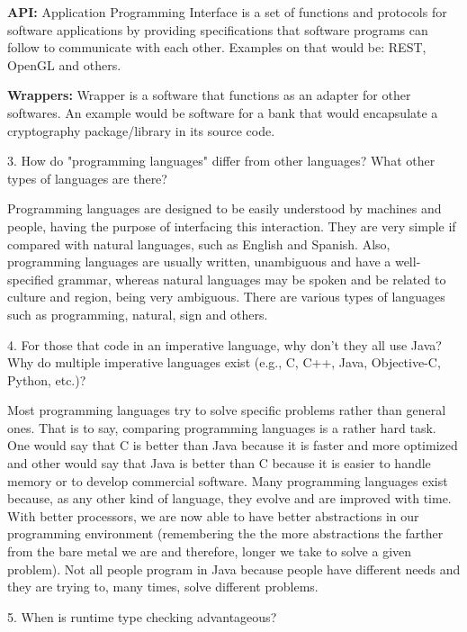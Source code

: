 \documentclass{article}
\begin{document}
\textbf{API:} Application Programming Interface is a set of functions and protocols for software applications by providing specifications that software programs can follow to communicate with each other. Examples on that would be: REST, OpenGL and others.

\textbf{Wrappers:} Wrapper is a software that functions as an adapter for other softwares. An example would be software for a bank that would encapsulate a cryptography package/library in its source code. 
\newline

3. How do "programming languages" differ from other languages? What other types of languages are there?
\newline

Programming languages are designed to be easily understood by machines and people, having the purpose of interfacing this interaction. They are very simple if compared with natural languages, such as English and Spanish. Also, programming languages are usually written, unambiguous and have a well-specified grammar, whereas natural languages may be spoken and be related to culture and region, being very ambiguous. There are various types of languages such as programming, natural, sign and others. 
\newline

4. For those that code in an imperative language, why don't they all use Java? Why do multiple imperative languages exist (e.g., C, C++, Java, Objective-C, Python, etc.)?
\newline

Most programming languages try to solve specific problems rather than general ones. That is to say, comparing programming languages is a rather hard task. One would say that C is better than Java because it is faster and more optimized and other would say that Java is better than C because it is easier to handle memory or to develop commercial software. Many programming languages exist because, as any other kind of language, they evolve and are improved with time. With better processors, we are now able to have better abstractions in our programming environment (remembering the the more abstractions the farther from the bare metal we are and therefore, longer we take to solve a given problem). Not all people program in Java because people have different needs and they are trying to, many times, solve different problems.
\newline

5. When is runtime type checking advantageous?
\newline
\end{document}
